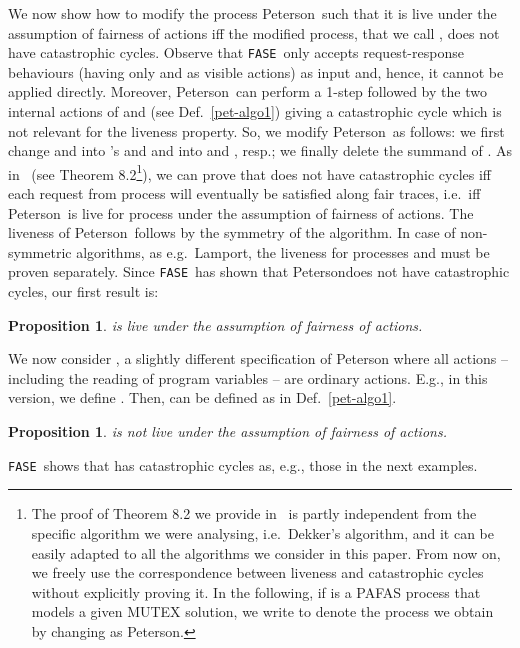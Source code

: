 \documentclass[copyright,creativecommons]{eptcs}
\newenvironment{proof}{\noindent {\bf Proof:}}{\bigskip}
\newtheorem{proposition}[theorem]{Proposition}
\newcommand{\fase}{\texttt{FASE}}
\newcommand{\petersona}{{\sf Peterson}} \newcommand{\petersonb}{\petersona}
\begin{document}
We now show how to modify the process \petersona\  such that it is live 
under the assumption of fairness of actions iff the modified process, that
we call , does not have catastrophic cycles. Observe that 
\fase\ only accepts request-response behaviours (having only  and 
as visible actions) as input and, hence, it cannot be applied directly.
Moreover, \petersona\ can perform a 1-step followed by the two internal
actions of  and  (see Def.~\ref{pet-algo1}) giving a catastrophic
cycle which is not relevant for the liveness property. So, we modify
\petersona\ as follows: we first change  and  into 's
and  and  into  and , resp.; we finally  delete the
 summand of . As in~\cite{CDV08tr} (see Theorem 8.2\footnote{The
proof of Theorem 8.2 we provide in~\cite{CDV08tr} is partly independent
from the specific algorithm we were analysing, i.e.\ Dekker's algorithm,
and it can be easily adapted to all the algorithms we consider in this
paper. From now on, we freely use the correspondence between liveness and
catastrophic cycles without explicitly proving it. In the following, if 
is a PAFAS process that models a given MUTEX solution, we write
 to denote the process we obtain by changing  as \petersona.}),
we can prove that  does not have catastrophic cycles iff
each request from process  will eventually be satisfied along fair
traces, i.e.\ iff \petersona\ is live for  process  under the
assumption of fairness of actions. The liveness of \petersona\ follows by
the symmetry of the algorithm. In case of non-symmetric algorithms, as
e.g.\ Lamport, the liveness for processes  and   must be
proven separately. Since \fase\ has shown that \petersona does not
have catastrophic cycles, our first result is:

\begin{proposition}\label{prop:pet-live}
 is live under the assumption of fairness of actions.
\end{proposition}
We now consider , a slightly different specification of
Peterson where all actions -- including the reading of program variables --
are ordinary actions. E.g., in this version, we define . Then,   can be defined as in
Def.~\ref{pet-algo1}.

\begin{proposition}\label{prop:pet-non-live} 
  is not live under the assumption of fairness of actions.
\end{proposition}
\begin{proof}
\fase\  shows that  has  catastrophic cycles as,
e.g., those in the next examples.
\end{proof}
\end{document}
